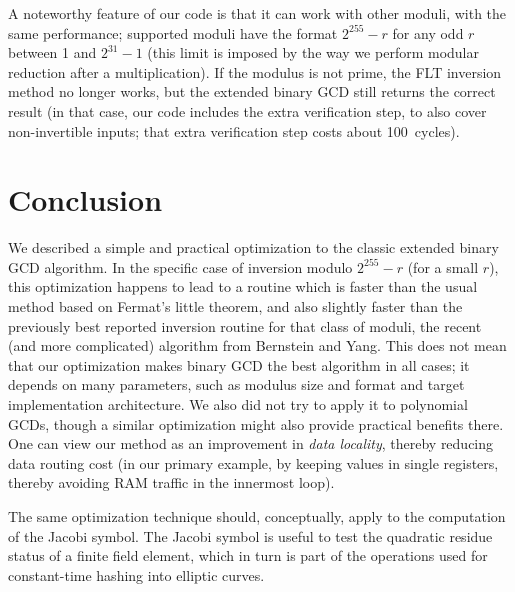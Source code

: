 \documentclass{llncs}
\begin{document}
A noteworthy feature of our code is that it can work with other moduli,
with the same performance; supported moduli have the format $2^{255}-r$
for any odd $r$ between 1 and $2^{31}-1$ (this limit is imposed by the
way we perform modular reduction after a multiplication). If the modulus
is not prime, the FLT inversion method no longer works, but the extended
binary GCD still returns the correct result (in that case, our code
includes the extra verification step, to also cover non-invertible inputs;
that extra verification step costs about 100~cycles).

\section{Conclusion}

We described a simple and practical optimization to the classic extended
binary GCD algorithm. In the specific case of inversion modulo
$2^{255}-r$ (for a small $r$), this optimization happens to lead to a
routine which is faster than the usual method based on Fermat's little
theorem, and also slightly faster than the previously best reported
inversion routine for that class of moduli, the recent (and more
complicated) algorithm from Bernstein and Yang. This does not mean that
our optimization makes binary GCD the best algorithm in all cases; it
depends on many parameters, such as modulus size and format and target
implementation architecture. We also did not try to apply it to
polynomial GCDs, though a similar optimization might also provide
practical benefits there. One can view our method as an improvement in
\emph{data locality}, thereby reducing data routing cost (in our primary
example, by keeping values in single registers, thereby avoiding RAM
traffic in the innermost loop).

The same optimization technique should, conceptually, apply to the
computation of the Jacobi symbol\cite{Coh1993}. The Jacobi symbol
is useful to test the quadratic residue status of a finite field element,
which in turn is part of the operations used for constant-time hashing
into elliptic curves\cite{DraftHashToCurve09}.
\end{document}
